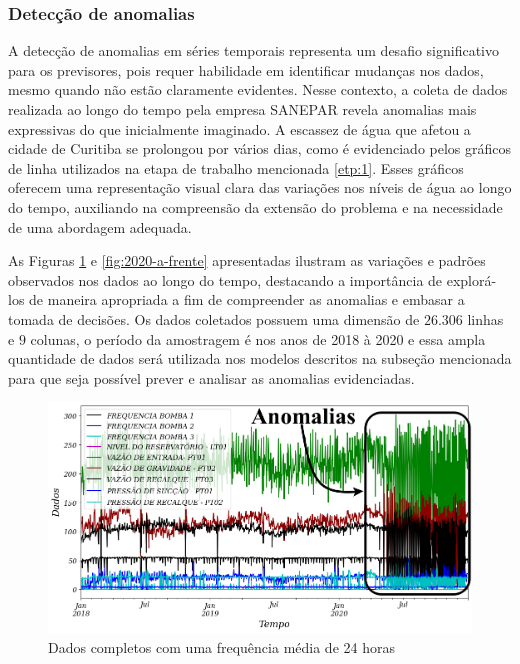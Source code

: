  
\newpage

\subsubsection{Detec\c c\~ao de anomalias} \label{subsec:detec}



A detecção de anomalias em séries temporais representa um desafio significativo para os previsores, pois requer habilidade em identificar mudanças nos dados, mesmo quando não estão claramente evidentes. Nesse contexto, a coleta de dados realizada ao longo do tempo pela empresa SANEPAR revela anomalias mais expressivas do que inicialmente imaginado. A escassez de água que afetou a cidade de Curitiba se prolongou por vários dias, como é evidenciado pelos gráficos de linha utilizados na etapa de trabalho mencionada \eqref{etp:1}. Esses gráficos oferecem uma representação visual clara das variações nos níveis de água ao longo do tempo, auxiliando na compreensão da extensão do problema e na necessidade de uma abordagem adequada.

As Figuras \ref{fig:dados-todos} e \ref{fig:2020-a-frente} apresentadas ilustram as variações e padrões observados nos dados ao longo do tempo, destacando a importância de explorá-los de maneira apropriada a fim de compreender as anomalias e embasar a tomada de decisões. Os dados coletados possuem uma dimensão de $26.306$ linhas e $9$ colunas, o período da amostragem é nos anos de 2018 à 2020 e essa ampla quantidade de dados será utilizada nos modelos descritos na subseção mencionada para que seja possível prever e analisar as anomalias evidenciadas.

\begin{figure}[H]
	\centering
	\caption{Dados completos com uma frequência média de 24 horas}
	\label{fig:dados-todos}
	\includegraphics[width=0.9\linewidth]{"Introducao/Figuras/dados todos"}
	
\end{figure}

